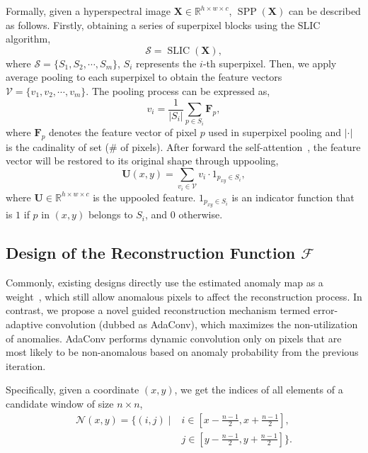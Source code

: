 Formally, given a hyperspectral image $\mathrm{\mathbf{X}} \in \mathbb{R}^{h\times w \times c}$, $\operatorname{SPP}(\mathrm{\mathbf{X}})$ can be described as follows. Firstly, obtaining a series of superpixel blocks using the SLIC~\cite{SLIC} algorithm,
\begin{equation}
    \mathcal{S}=\operatorname{SLIC}(\mathrm{\mathbf{X}}),
\end{equation}
where $\mathcal{S}=\{S_1, S_2, \cdots, S_m\}$, $S_i$ represents the $i$-th superpixel. Then, we apply average pooling to each superpixel to obtain the feature vectors $\mathcal{V} = \{v_1, v_2, \cdots, v_m\}$. The pooling process can be expressed as,
\begin{equation}
    v_i=\frac{1}{|S_i|}\sum_{p\in S_i}\mathrm{\mathbf{F}}_p,
\end{equation}
where $\mathrm{\mathbf{F}}_p$ denotes the feature vector of pixel $p$ used in superpixel pooling and $\left|\cdot\right|$ is the cadinality of set (\# of pixels). After forward the self-attention~\cite{vaswani2017attention,ViT}, the feature vector will be restored to its original shape through uppooling,
\begin{equation}
    \mathrm{\mathbf{U}}(x,y)=\sum_{v_i \in \mathcal{V}} v_i \cdot 1_{p_{xy} \in S_i},
\end{equation}
where $\mathrm{\mathbf{U}}\in \mathbb{R}^{h\times w \times c}$ is the uppooled feature. $1_{p_{xy} \in S_i}$ is an indicator function that is $1$ if $p$ in $(x, y)$ belongs to $S_i$, and $0$ otherwise.






\subsection{Design of the Reconstruction Function $\mathcal{F}$}


Commonly, existing designs directly use the estimated anomaly map as a weight~\cite{AutoAD,BiGSeT,MSNet,DeepLR,S2DWMTrans}, which still allow anomalous pixels to affect the reconstruction process. In contrast, we propose a novel guided reconstruction mechanism termed error-adaptive convolution (dubbed as AdaConv), which maximizes the non-utilization of anomalies. AdaConv performs dynamic convolution only on pixels that are most likely to be non-anomalous based on anomaly probability from the previous iteration. 

Specifically, given a coordinate $(x,y)$, we get the indices of all elements of a candidate window of size $n\times n$, 
\begin{equation}
    \begin{split}
    \mathcal{N}(x,y) = \{(i,j) \mid & i \in [x - \frac{n-1}{2}, x + \frac{n-1}{2}], \\
    & j \in [y - \frac{n-1}{2}, y + \frac{n-1}{2}]\}.
    \end{split}
    \end{equation}
    \vspace{-3mm}


